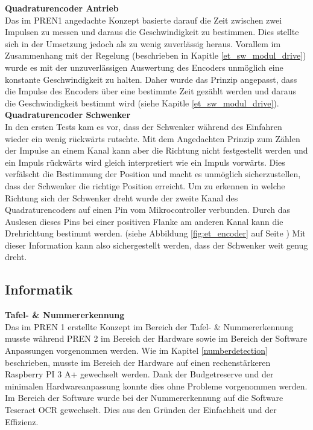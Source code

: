 \documentclass[../../main.tex]{subfiles}
\begin{document}
\textbf{Quadraturencoder Antrieb}\\
Das im PREN1 angedachte Konzept basierte darauf die Zeit zwischen zwei Impulsen zu messen und daraus die Geschwindigkeit zu bestimmen. Dies stellte sich in der Umsetzung jedoch als zu wenig zuverlässig heraus. Vorallem im Zusammenhang mit der Regelung (beschrieben in Kapitle \ref{et_sw_modul_drive}) wurde es mit der unzuverlässigen Auswertung des Encoders unmöglich eine konstante Geschwindigkeit zu halten. Daher wurde das Prinzip angepasst, dass die Impulse des Encoders über eine bestimmte Zeit gezählt werden und daraus die Geschwindigkeit bestimmt wird (siehe Kapitle \ref{et_sw_modul_drive}).\\

\textbf{Quadraturencoder Schwenker}\\
In den ersten Tests kam es vor, dass der Schwenker während des Einfahren wieder ein wenig rückwärts rutschte. Mit dem Angedachten Prinzip zum Zählen der Impulse an einem Kanal kann aber die Richtung nicht festgestellt werden und ein Impuls rückwärts wird gleich interpretiert wie ein Impuls vorwärts. Dies verfälscht die Bestimmung der Position und macht es unmöglich sicherzustellen, dass der Schwenker die richtige Position erreicht. Um zu erkennen in welche Richtung sich der Schwenker dreht wurde der zweite Kanal des Quadraturencoders auf einen Pin vom Mikrocontroller verbunden. Durch das Auslesen dieses Pins bei einer positiven Flanke am anderen Kanal kann die Drehrichtung bestimmt werden. (siehe Abbildung \ref{fig:et_encoder} auf Seite \pageref{fig:et_encoder}) Mit dieser Information kann also sichergestellt werden, dass der Schwenker weit genug dreht.\\ 

\subsection{Informatik}

\textbf{Tafel- \& Nummererkennung}\\
Das im PREN 1 erstellte Konzept im Bereich der Tafel- \& Nummererkennung musste während PREN 2 im Bereich der Hardware sowie im Bereich der Software Anpassungen vorgenommen werden. Wie im Kapitel \ref{numberdetection} beschrieben, musste im Bereich der Hardware auf einen rechenstärkeren Raspberry PI 3 A+ gewechselt werden. Dank der Budgetreserve und der minimalen Hardwareanpassung konnte dies ohne Probleme vorgenommen werden. Im Bereich der Software wurde bei der Nummererkennung auf die Software Teseract OCR gewechselt. Dies aus den Gründen der Einfachheit und der Effizienz. 
\end{document}
